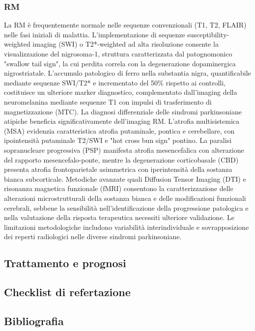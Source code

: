 \subsubsection{RM}
La RM è frequentemente normale nelle sequenze convenzionali (T1, T2, FLAIR) nelle fasi iniziali di malattia. L'implementazione di sequenze susceptibility-weighted imaging (SWI) o T2*-weighted ad alta risoluzione consente la visualizzazione del nigrosoma-1, struttura caratterizzata dal patognomonico "swallow tail sign", la cui perdita correla con la degenerazione dopaminergica nigrostriatale. L'accumulo patologico di ferro nella substantia nigra, quantificabile mediante sequenze SWI/T2* e incrementato del 50\% rispetto ai controlli, costituisce un ulteriore marker diagnostico, complementato dall'imaging della neuromelanina mediante sequenze T1 con impulsi di trasferimento di magnetizzazione (MTC).
La diagnosi differenziale delle sindromi parkinsoniane atipiche beneficia significativamente dell'imaging RM. L'atrofia multisistemica (MSA) evidenzia caratteristica atrofia putaminale, pontica e cerebellare, con ipointensità putaminale T2/SWI e "hot cross bun sign" pontino. La paralisi sopranucleare progressiva (PSP) manifesta atrofia mesencefalica con alterazione del rapporto mesencefalo-ponte, mentre la degenerazione corticobasale (CBD) presenta atrofia frontoparietale asimmetrica con iperintensità della sostanza bianca subcorticale.
Metodiche avanzate quali Diffusion Tensor Imaging (DTI) e risonanza magnetica funzionale (fMRI) consentono la caratterizzazione delle alterazioni microstrutturali della sostanza bianca e delle modificazioni funzionali cerebrali, sebbene la sensibilità nell'identificazione della progressione patologica e nella valutazione della risposta terapeutica necessiti ulteriore validazione. Le limitazioni metodologiche includono variabilità interindividuale e sovrapposizione dei reperti radiologici nelle diverse sindromi parkinsoniane.

\subsection{Trattamento e prognosi}

\subsection{Checklist di refertazione}

\subsection{Bibliografia}
\small{
	
	
}

